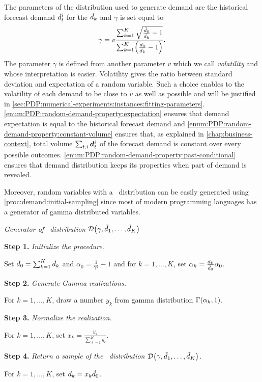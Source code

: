 The parameters of the \distrib distribution used to generate demand are the historical forecast demand $\bar{d}_t^i$ for the $\tilde{d}_k$ and $\gamma$ is set equal to
\begin{equation}
  \gamma
  =
  v\frac
  {\sum_{k=1}^K\sqrt{\frac{\tilde{\demand}_0}{\bar{\demand_k}}-1}}
  {\sum_{k=1}^K\bracket{\frac{\tilde{\demand}_0}{\bar{\demand_k}}-1}}.
\end{equation}
The parameter $\gamma$ is defined from another parameter $v$ which we call \emph{volatility} and whose interpretation is easier.
Volatility gives the ratio between standard deviation and expectation of a random variable.
Such a choice enables to the volatility of each demand to be close to $v$ as well as possible and will be justified in \cref{sec:PDP:numerical-experiments:instances:fitting-parameters}.
\cref{enum:PDP:random-demand-property:expectation} ensures that demand expectation is equal to the historical forecast demand and \cref{enum:PDP:random-demand-property:constant-volume} ensures that, as explained in \cref{chap:business-context}, total volume $\sum_{t,i}\va\demand_t^i$ of the forecast demand is constant over every possible outcomes.
\cref{enum:PDP:random-demand-property:past-conditional} ensures that demand distribution keeps its properties when part of demand is revealed.


Moreover, random variables with a \distrib\ distribution can be easily generated using \cref{proc:demand:initial-sampling} since most of modern programming languages has a generator of gamma distributed variables.


\begin{proc}\label{proc:demand:initial-sampling}
\emph{Generator of \distrib\ distribution $\cD\bracket{\gamma,\tilde{\demand}_1,\ldots,\tilde{\demand}_K}$}

\textbf{Step 1.} \emph{Initialize the procedure.}

Set $\tilde{d}_0 = \sum_{k=1}^K\tilde{d}_k$ and $\alpha_0 = \frac{1}{\gamma^2}-1$ and for $k=1,\ldots,K$, set $\alpha_k=\frac{\tilde{d}_k}{\tilde{d}_0}\alpha_0$.

\textbf{Step 2.} \emph{Generate Gamma realizations.}

For $k=1,\ldots,K$, draw a number $y_k$ from gamma distribution $\Gamma\bracket{\alpha_k,1}$.

\textbf{Step 3.} \emph{Normalize the realization.}

For $k=1,\ldots,K$, set $x_k=\frac{y_k}{\sum_{\ell=1}^K y_{\ell}}$.

\textbf{Step 4.} \emph{Return a sample of the \distrib\ distribution $\cD\bracket{\gamma,\tilde{\demand}_1,\ldots,\tilde{\demand}_K}$.}

For $k=1,\ldots,K$, set $d_k = x_k \tilde{d}_0$.
\end{proc}


